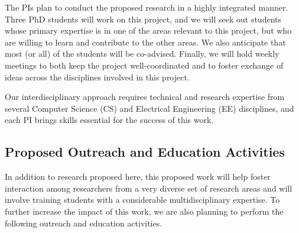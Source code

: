 \documentclass[11 pt]{article}
\begin{document}
The PIs plan to conduct the proposed research in a highly integrated manner.
Three PhD students will work on this project, and we will seek out students
whose primary expertise is in one of the areas relevant to this project,
but who are willing to learn and contribute to the other areas. We also
anticipate that most (or all) of the students will be co-advised. Finally,
we will hold weekly meetings to both keep the project well-coordinated and
to foster exchange of ideas across the disciplines involved in this project.

Our interdisciplinary approach requires technical and research
expertise from several Computer Science (CS) and Electrical Engineering (EE) disciplines, and each PI brings skills essential for the success of this work.



\subsection{Proposed Outreach and Education Activities}

In addition to research proposed here, this proposed work will help foster interaction among researchers from a
very diverse set of research areas and will involve training students
with a considerable multidisciplinary expertise. To further increase
the impact of this work, we are also planning to perform the following
outreach and education activities.
\end{document}
